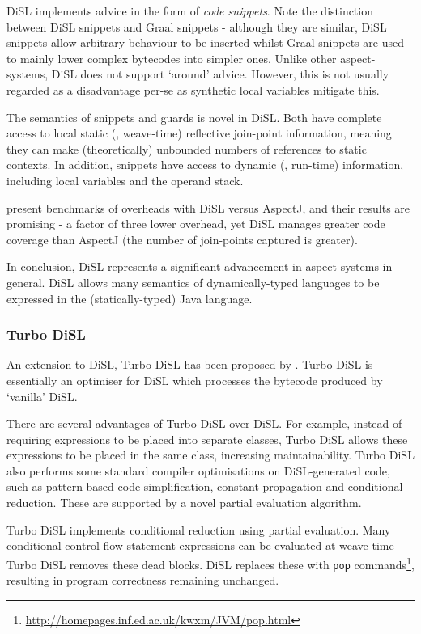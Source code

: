                 DiSL implements advice in the form of \textit{code snippets}. Note the distinction between DiSL snippets and Graal snippets - although they are similar, DiSL snippets allow arbitrary behaviour to be inserted whilst Graal snippets are used to mainly lower complex bytecodes into simpler ones. Unlike other aspect-systems, DiSL does not support `around' advice. However, this is not usually regarded as a disadvantage per-se as synthetic local variables mitigate this.

                The semantics of snippets and guards is novel in DiSL. Both have complete access to local static (\ie, weave-time) reflective join-point information, meaning they can make (theoretically) unbounded numbers of references to static contexts. In addition, snippets have access to dynamic (\ie, run-time) information, including local variables and the operand stack.

                \citeauthor{Marek2012} present benchmarks of overheads with DiSL versus AspectJ, and their results are promising - a factor of three lower overhead, yet DiSL manages greater code coverage than AspectJ (the number of join-points captured is greater).

                In conclusion, DiSL represents a significant advancement in aspect-systems in general. DiSL allows many semantics of dynamically-typed languages to be expressed in the (statically-typed) Java language.

                \subsubsection{Turbo DiSL} \label{sec:instrumentation/hybrid/disl/turbo}
                An extension to DiSL, Turbo DiSL has been proposed by \citet[p.~353-368]{Furia2012}. Turbo DiSL is essentially an optimiser for DiSL which processes the bytecode produced by `vanilla' DiSL.

                There are several advantages of Turbo DiSL over DiSL. For example, instead of requiring expressions to be placed into separate classes, Turbo DiSL allows these expressions to be placed in the same class, increasing maintainability. Turbo DiSL also performs some standard compiler optimisations on DiSL-generated code, such as pattern-based code simplification, constant propagation and conditional reduction. These are supported by a novel partial evaluation algorithm.

                Turbo DiSL implements conditional reduction using partial evaluation. Many conditional control-flow statement expressions can be evaluated at weave-time -- Turbo DiSL removes these dead blocks. DiSL replaces these with \texttt{pop} commands\footnote{\url{http://homepages.inf.ed.ac.uk/kwxm/JVM/pop.html}}, resulting in program correctness remaining unchanged.

